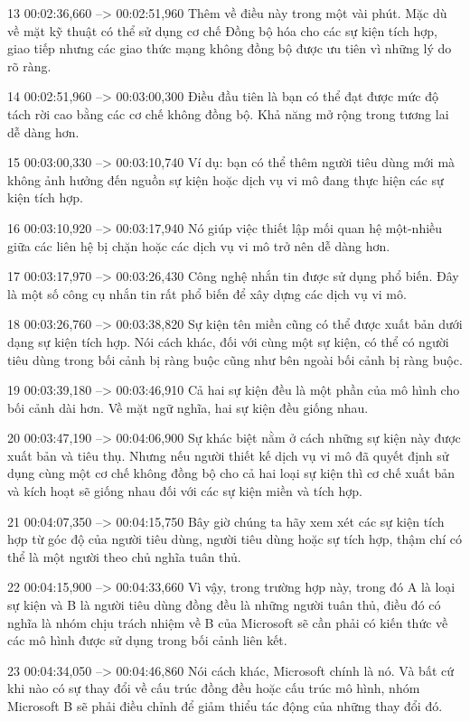 13
00:02:36,660 --> 00:02:51,960
Thêm về điều này trong một vài phút.  Mặc dù về mặt kỹ thuật có thể sử dụng cơ chế Đồng bộ hóa cho các sự kiện tích hợp, giao tiếp nhưng các giao thức mạng không đồng bộ được ưu tiên vì những lý do rõ ràng.

14
00:02:51,960 --> 00:03:00,300
Điều đầu tiên là bạn có thể đạt được mức độ tách rời cao bằng các cơ chế không đồng bộ.  Khả năng mở rộng trong tương lai dễ dàng hơn.

15
00:03:00,330 --> 00:03:10,740
Ví dụ: bạn có thể thêm người tiêu dùng mới mà không ảnh hưởng đến nguồn sự kiện hoặc dịch vụ vi mô đang thực hiện các sự kiện tích hợp.

16
00:03:10,920 --> 00:03:17,940
Nó giúp việc thiết lập mối quan hệ một-nhiều giữa các liên hệ bị chặn hoặc các dịch vụ vi mô trở nên dễ dàng hơn.

17
00:03:17,970 --> 00:03:26,430
Công nghệ nhắn tin được sử dụng phổ biến.  Đây là một số công cụ nhắn tin rất phổ biến để xây dựng các dịch vụ vi mô.

18
00:03:26,760 --> 00:03:38,820
Sự kiện tên miền cũng có thể được xuất bản dưới dạng sự kiện tích hợp.  Nói cách khác, đối với cùng một sự kiện, có thể có người tiêu dùng trong bối cảnh bị ràng buộc cũng như bên ngoài bối cảnh bị ràng buộc.

19
00:03:39,180 --> 00:03:46,910
Cả hai sự kiện đều là một phần của mô hình cho bối cảnh dài hơn.  Về mặt ngữ nghĩa, hai sự kiện đều giống nhau.

20
00:03:47,190 --> 00:04:06,900
Sự khác biệt nằm ở cách những sự kiện này được xuất bản và tiêu thụ.  Nhưng nếu người thiết kế dịch vụ vi mô đã quyết định sử dụng cùng một cơ chế không đồng bộ cho cả hai loại sự kiện thì cơ chế xuất bản và kích hoạt sẽ giống nhau đối với các sự kiện miền và tích hợp.

21
00:04:07,350 --> 00:04:15,750
Bây giờ chúng ta hãy xem xét các sự kiện tích hợp từ góc độ của người tiêu dùng, người tiêu dùng hoặc sự tích hợp, thậm chí có thể là một người theo chủ nghĩa tuân thủ.

22
00:04:15,900 --> 00:04:33,660
Vì vậy, trong trường hợp này, trong đó A là loại sự kiện và B là người tiêu dùng đồng đều là những người tuân thủ, điều đó có nghĩa là nhóm chịu trách nhiệm về B của Microsoft sẽ cần phải có kiến ​​thức về các mô hình được sử dụng trong bối cảnh liên kết.

23
00:04:34,050 --> 00:04:46,860
Nói cách khác, Microsoft chính là nó.  Và bất cứ khi nào có sự thay đổi về cấu trúc đồng đều hoặc cấu trúc mô hình, nhóm Microsoft B sẽ phải điều chỉnh để giảm thiểu tác động của những thay đổi đó.

